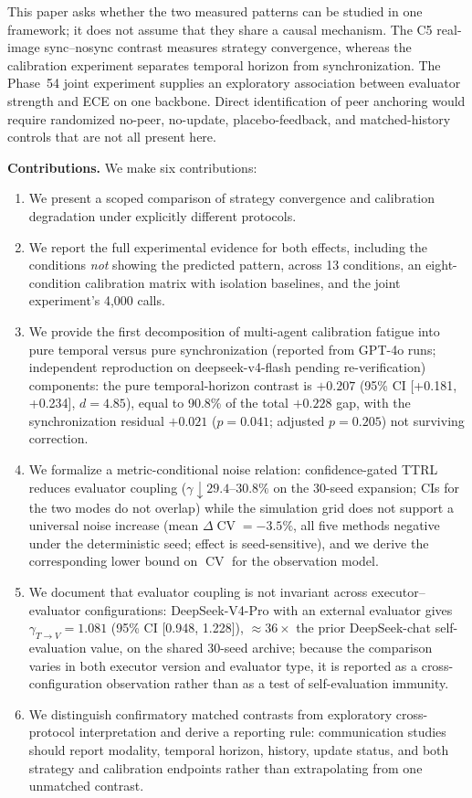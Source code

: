 \documentclass[11pt]{article}
\DeclareMathOperator{\CV}{CV}
\begin{document}
This paper asks whether the two measured patterns can be studied in one framework; it does not assume that they share a causal mechanism. The C5 real-image sync--nosync contrast measures strategy convergence, whereas the calibration experiment separates temporal horizon from synchronization. The Phase~54 joint experiment supplies an exploratory association between evaluator strength and ECE on one backbone. Direct identification of peer anchoring would require randomized no-peer, no-update, placebo-feedback, and matched-history controls that are not all present here.

\textbf{Contributions.} We make six contributions:
\begin{enumerate}[leftmargin=*,nosep]
 \item We present a scoped comparison of strategy convergence and calibration degradation under explicitly different protocols.
 \item We report the full experimental evidence for both effects, including the conditions \textit{not} showing the predicted pattern, across 13 conditions, an eight-condition calibration matrix with isolation baselines, and the joint experiment's 4,000 calls.
 \item We provide the first decomposition of multi-agent calibration fatigue into pure temporal versus pure synchronization (reported from GPT-4o runs; independent reproduction on deepseek-v4-flash pending re-verification) components: the pure temporal-horizon contrast is $+0.207$ (95\% CI [+0.181, +0.234], $d{=}4.85$), equal to 90.8\% of the total $+0.228$ gap, with the synchronization residual $+0.021$ ($p{=}0.041$; adjusted $p{=}0.205$) not surviving correction.
 \item We formalize a metric-conditional noise relation: confidence-gated TTRL reduces evaluator coupling ($\gamma \downarrow 29.4$--$30.8\%$ on the 30-seed expansion; CIs for the two modes do not overlap) while the simulation grid does not support a universal noise increase (mean $\Delta\CV = -3.5\%$, all five methods negative under the deterministic seed; effect is seed-sensitive), and we derive the corresponding lower bound on $\CV$ for the observation model.
 \item We document that evaluator coupling is not invariant across executor--evaluator configurations: DeepSeek-V4-Pro with an external evaluator gives $\gamma_{T\to V}{=}1.081$ (95\% CI [0.948, 1.228]), $\approx 36\times$ the prior DeepSeek-chat self-evaluation value, on the shared 30-seed archive; because the comparison varies in both executor version and evaluator type, it is reported as a cross-configuration observation rather than as a test of self-evaluation immunity.
 \item We distinguish confirmatory matched contrasts from exploratory cross-protocol interpretation and derive a reporting rule: communication studies should report modality, temporal horizon, history, update status, and both strategy and calibration endpoints rather than extrapolating from one unmatched contrast.
\end{enumerate}
\end{document}
